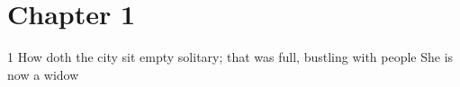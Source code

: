 \documentclass{article}
\begin{document}
\section*{Chapter 1}

1 How doth the city sit
empty solitary;
that was full, bustling with people
She is now a widow
\end{document}
